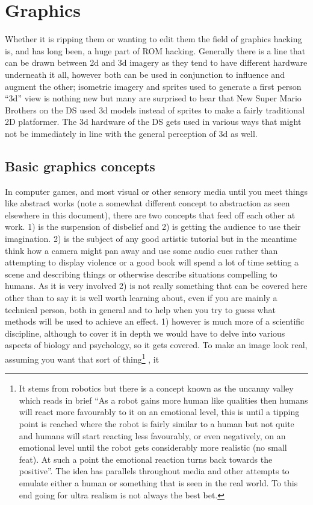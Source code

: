 \documentclass[
]{book}
\begin{document}
\hypertarget{graphics}{%
\chapter{Graphics}\label{graphics}}

Whether it is ripping them or wanting to edit them the field of graphics hacking is, and has long been, a huge part of ROM hacking. Generally there is a line that can be drawn between 2d and 3d imagery as they tend to have different hardware underneath it all, however both can be used in conjunction to influence and augment the other; isometric imagery and sprites used to generate a first person ``3d'' view is nothing new but many are surprised to hear that New Super Mario Brothers on the DS used 3d models instead of sprites to make a fairly traditional 2D platformer. The 3d hardware of the DS gets used in various ways that might not be immediately in line with the general perception of 3d as well.

\hypertarget{basic-graphics-concepts}{%
\section{Basic graphics concepts}\label{basic-graphics-concepts}}

In computer games, and most visual or other sensory media until you meet things like abstract works (note a somewhat different concept to abstraction as seen elsewhere in this document), there are two concepts that feed off each other at work. 1) is the suspension of disbelief and 2) is getting the audience to use their imagination. 2) is the subject of any good artistic tutorial but in the meantime think how a camera might pan away and use some audio cues rather than attempting to display violence or a good book will spend a lot of time setting a scene and describing things or otherwise describe situations compelling to humans. As it is very involved 2) is not really something that can be covered here other than to say it is well worth learning about, even if you are mainly a technical person, both in general and to help when you try to guess what methods will be used to achieve an effect. 1) however is much more of a scientific discipline, although to cover it in depth we would have to delve into various aspects of biology and psychology, so it gets covered. To make an image look real, assuming you want that sort of thing\footnote{It stems from robotics but there is a concept known as the uncanny valley which reads in brief ``As a robot gains more human like qualities then humans will react more favourably to it on an emotional level, this is until a tipping point is reached where the robot is fairly similar to a human but not quite and humans will start reacting less favourably, or even negatively, on an emotional level until the robot gets considerably more realistic (no small feat). At such a point the emotional reaction turns back towards the positive''. The idea has parallels throughout media and other attempts to emulate either a human or something that is seen in the real world. To this end going for ultra realism is not always the best bet.} , it
\end{document}
